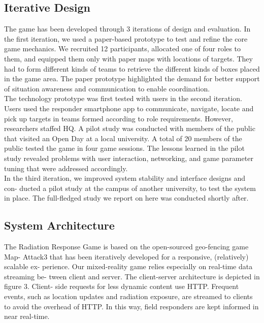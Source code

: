 \subsection{Iterative Design}

The game has been developed through 3 iterations of design and evaluation.
In the first iteration, we used a paper-based prototype to test and refine the core game mechanics. We recruited 12 participants, allocated one of four roles to them, and equipped them only with paper maps with locations of targets. They had to form different kinds of teams to retrieve the different kinds of boxes placed in the game area. The paper prototype highlighted the demand for better support of situation
awareness and communication to enable coordination.\\

The technology prototype was first tested with users in the second iteration. Users
used the responder smartphone app to communicate, navigate, locate and pick up targets in teams formed according to role requirements. However, researchers staffed HQ. A pilot study was conducted with members of the public that visited an Open Day at a local university. A total of 20 members of the public tested the game in four game sessions. The lessons learned in the pilot study revealed problems with user interaction, networking, and game parameter tuning that were addressed accordingly.\\

In the third iteration, we improved system stability and interface designs and con- ducted a pilot study at the campus of another university, to test the system in place. The full-fledged study we report on here was conducted shortly after.

\subsection{System Architecture}
The Radiation Response Game is based on the open-sourced geo-fencing game Map- Attack3 that has been iteratively developed for a responsive, (relatively) scalable ex- perience. Our mixed-reality game relies especially on real-time data streaming be- tween client and server. The client-server architecture is depicted in figure 3. Client- side requests for less dynamic content use HTTP. Frequent events, such as location updates and radiation exposure, are streamed to clients to avoid the overhead of HTTP. In this way, field responders are kept informed in near real-time.\\

